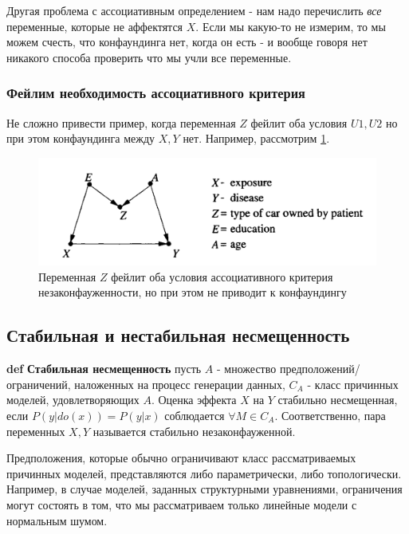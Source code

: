 \documentclass[fleqn]{article}
\def\define#1{\textbf{def} \textbf{#1}}
\numberwithin{equation}{section}
\numberwithin{theorem}{section}
\numberwithin{figure}{section}
\numberwithin{lemma}{section}
\numberwithin{corollary}{section}
\begin{document}
Другая проблема с ассоциативным определением - нам надо перечислить \textit{все} переменные, которые не аффектятся $X$. Если мы какую-то не измерим, то мы можем счесть, что конфаундинга нет, когда он есть - и вообще говоря нет никакого способа проверить что мы учли все переменные.

\subsubsection*{Фейлим необходимость ассоциативного критерия}

 Не сложно привести пример, когда переменная $Z$ фейлит оба условия $U1, U2$ но при этом конфаундинга между $X,Y$ нет. Например, рассмотрим \ref{fig:confounding}.

\begin{figure}[h]
	\begin{center}
		\includegraphics[scale=0.6]{imgs/img30.png}
	\end{center}
	\caption{Переменная $Z$ фейлит оба условия ассоциативного критерия незаконфауженности, но при этом не приводит к конфаундингу}
	\label{fig:confounding}
\end{figure}

\subsection*{Стабильная и нестабильная несмещенность}

\define{Стабильная несмещенность} пусть $A$ - множество предположений/ограничений, наложенных на процесс генерации данных, $C_A$ - класс причинных моделей, удовлетворяющих $A$. Оценка эффекта $X$ на $Y$ стабильно несмещенная, если $P(y|do(x)) = P(y|x)$ соблюдается $\forall M \in C_A$. Соответственно, пара переменных $X,Y$ называется стабильно незаконфауженной.

Предположения, которые обычно ограничивают класс рассматриваемых причинных моделей, представляются либо параметрически, либо топологически. Например, в случае моделей, заданных структурными уравнениями, ограничения могут состоять в том, что мы рассматриваем только линейные модели с нормальным шумом. 
\end{document}
